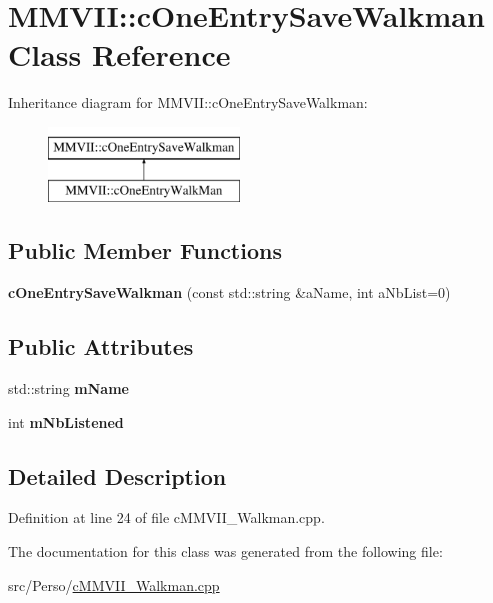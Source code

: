 \hypertarget{classMMVII_1_1cOneEntrySaveWalkman}{}\section{M\+M\+V\+II\+:\+:c\+One\+Entry\+Save\+Walkman Class Reference}
\label{classMMVII_1_1cOneEntrySaveWalkman}
Inheritance diagram for M\+M\+V\+II\+:\+:c\+One\+Entry\+Save\+Walkman\+:\begin{figure}[H]
\begin{center}
\leavevmode
\includegraphics[height=2.000000cm]{classMMVII_1_1cOneEntrySaveWalkman}
\end{center}
\end{figure}
\subsection*{Public Member Functions}
\begin{DoxyCompactItemize}
\item 
{\bfseries c\+One\+Entry\+Save\+Walkman} (const std\+::string \&a\+Name, int a\+Nb\+List=0)\hypertarget{classMMVII_1_1cOneEntrySaveWalkman_a7580fcc90c8822e262e355af59529ad6}{}\label{classMMVII_1_1cOneEntrySaveWalkman_a7580fcc90c8822e262e355af59529ad6}

\end{DoxyCompactItemize}
\subsection*{Public Attributes}
\begin{DoxyCompactItemize}
\item 
std\+::string {\bfseries m\+Name}\hypertarget{classMMVII_1_1cOneEntrySaveWalkman_a76d36631b34fa193445906a7dcf5405f}{}\label{classMMVII_1_1cOneEntrySaveWalkman_a76d36631b34fa193445906a7dcf5405f}

\item 
int {\bfseries m\+Nb\+Listened}\hypertarget{classMMVII_1_1cOneEntrySaveWalkman_a1c403de3c62cd3f8935deca860d53282}{}\label{classMMVII_1_1cOneEntrySaveWalkman_a1c403de3c62cd3f8935deca860d53282}

\end{DoxyCompactItemize}


\subsection{Detailed Description}


Definition at line 24 of file c\+M\+M\+V\+I\+I\+\_\+\+Walkman.\+cpp.



The documentation for this class was generated from the following file\+:\begin{DoxyCompactItemize}
\item 
src/\+Perso/\hyperlink{cMMVII__Walkman_8cpp}{c\+M\+M\+V\+I\+I\+\_\+\+Walkman.\+cpp}\end{DoxyCompactItemize}
